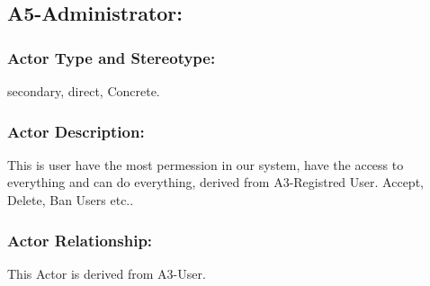 \documentclass[11pt, openany]{report}
\begin{document}

\clearpage

\subsection{A5-Administrator:}
\label{A5}
\subsubsection{Actor Type and Stereotype:}
secondary, direct, Concrete.
\subsubsection{Actor Description:}
This is user have the most permession in our system, have the access to everything and can do everything, derived from A3-Registred User.
Accept, Delete, Ban Users etc..
\subsubsection{Actor Relationship:}

This Actor is derived from A3-User.
\end{document}
